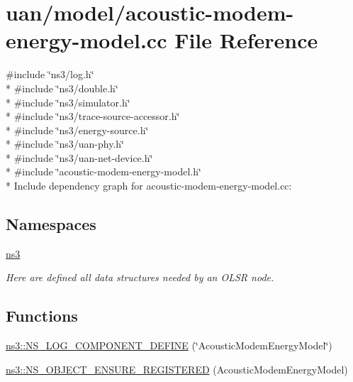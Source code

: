 \hypertarget{acoustic-modem-energy-model_8cc}{}\section{uan/model/acoustic-\/modem-\/energy-\/model.cc File Reference}
\label{acoustic-modem-energy-model_8cc}
{\ttfamily \#include \char`\"{}ns3/log.\+h\char`\"{}}\\*
{\ttfamily \#include \char`\"{}ns3/double.\+h\char`\"{}}\\*
{\ttfamily \#include \char`\"{}ns3/simulator.\+h\char`\"{}}\\*
{\ttfamily \#include \char`\"{}ns3/trace-\/source-\/accessor.\+h\char`\"{}}\\*
{\ttfamily \#include \char`\"{}ns3/energy-\/source.\+h\char`\"{}}\\*
{\ttfamily \#include \char`\"{}ns3/uan-\/phy.\+h\char`\"{}}\\*
{\ttfamily \#include \char`\"{}ns3/uan-\/net-\/device.\+h\char`\"{}}\\*
{\ttfamily \#include \char`\"{}acoustic-\/modem-\/energy-\/model.\+h\char`\"{}}\\*
Include dependency graph for acoustic-\/modem-\/energy-\/model.cc\+:
\subsection*{Namespaces}
\begin{DoxyCompactItemize}
\item 
 \hyperlink{namespacens3}{ns3}
\begin{DoxyCompactList}\small\item\em Here are defined all data structures needed by an O\+L\+SR node. \end{DoxyCompactList}\end{DoxyCompactItemize}
\subsection*{Functions}
\begin{DoxyCompactItemize}
\item 
\hyperlink{namespacens3_a7d3c2e14f7af638d857b45a76c496871}{ns3\+::\+N\+S\+\_\+\+L\+O\+G\+\_\+\+C\+O\+M\+P\+O\+N\+E\+N\+T\+\_\+\+D\+E\+F\+I\+NE} (\char`\"{}Acoustic\+Modem\+Energy\+Model\char`\"{})
\item 
\hyperlink{namespacens3_ac5d4aa5431c1b346f1d863ee17ab6882}{ns3\+::\+N\+S\+\_\+\+O\+B\+J\+E\+C\+T\+\_\+\+E\+N\+S\+U\+R\+E\+\_\+\+R\+E\+G\+I\+S\+T\+E\+R\+ED} (Acoustic\+Modem\+Energy\+Model)
\end{DoxyCompactItemize}
